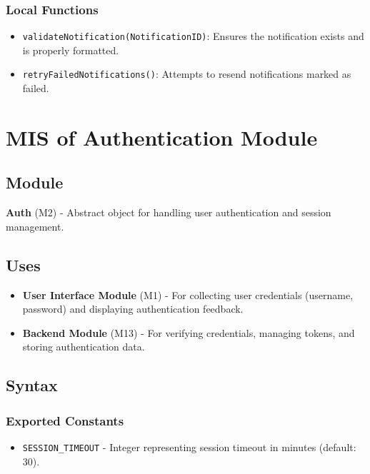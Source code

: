 \documentclass[12pt, titlepage]{article}
\begin{document}
\subsubsection{Local Functions}

\begin{itemize}
    \item \texttt{validateNotification(NotificationID)}: Ensures the notification exists and is properly formatted.
    \item \texttt{retryFailedNotifications()}: Attempts to resend notifications marked as failed.
\end{itemize}

\newpage

\section{MIS of Authentication Module} \label{Auth}

\subsection{Module}

\textbf{Auth} (M2) - Abstract object for handling user authentication and session management.

\subsection{Uses}

\begin{itemize}
	\item \textbf{User Interface Module} (M1) - For collecting user credentials (username, password)
	and displaying authentication feedback.
	\item \textbf{Backend Module} (M13) - For verifying credentials, managing tokens, and storing
	authentication data.
\end{itemize}


\subsection{Syntax}

\subsubsection{Exported Constants}
\begin{itemize}
	\item \texttt{SESSION\_TIMEOUT} - Integer representing session timeout in minutes (default: 30).
\end{itemize}
\end{document}
